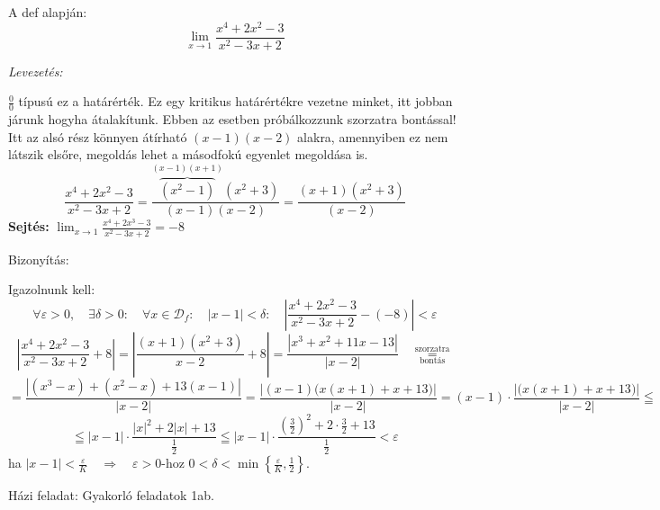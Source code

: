 \documentclass[a4paper,11.5pt]{article}
\begin{document}
		\begin{task}
			A def alapján:
			\[ \lim_{x\to1}\frac{x^4+2x^2-3}{x^2-3x+2} \]
			
			\textit{Levezetés:}
			
			$\frac{0}{0}$ típusú ez a határérték. Ez egy kritikus határértékre vezetne minket, itt jobban járunk hogyha átalakítunk. Ebben az esetben próbálkozzunk szorzatra bontással!
			Itt az alsó rész könnyen átírható $(x-1)(x-2)$ alakra, amennyiben ez nem látszik elsőre, megoldás lehet a másodfokú egyenlet megoldása is.
			\[ \frac{x^4+2x^2-3}{x^2-3x+2} = \frac{\overbrace{(x^2-1)}^{(x-1)(x+1)}(x^2+3)}{(x-1)(x-2)} = \frac{(x+1)(x^2+3)}{(x-2)}\]
			\textbf{Sejtés:} $\displaystyle \lim_{x\to1}\frac{x^4+2x^3-3}{x^2-3x+2} = -8$
			
			Bizonyítás:
			
			Igazolnunk kell:
			\[ \forall\varepsilon>0,\quad \exists\delta>0:\quad \forall x\in\mathcal{D}_f:\quad |x-1|<\delta:\quad  \left|\frac{x^4+2x^2-3}{x^2-3x+2}-(-8)\right|<\varepsilon\]
			\[ \left|\frac{x^4+2x^2-3}{x^2-3x+2} + 8\right| = \left|\frac{(x+1)(x^2+3)}{x-2} + 8\right| = \frac{\left|x^3+x^2+11x-13\right|}{|x-2|} \quad \overset{\text{szorzatra}}{\underset{\text{bontás}}{=}}\]
			\[ = \frac{\left|(x^3-x)+(x^2-x)+13(x-1)\right|}{|x-2|} = \frac{\big|(x-1)\big(x(x+1)+x+13\big)\big|}{|x-2|} = (x-1)\cdot\frac{\big|\big(x(x+1)+x+13\big)\big|}{|x-2|}\leqq \]
			\[ \leqq |x-1|\cdot\frac{|x|^2+2|x|+13}{\frac{1}{2}}\leqq|x-1|\cdot \frac{\left(\frac{3}{2}\right)^2+2\cdot\frac{3}{2}+13}{\frac{1}{2}}<\varepsilon \]
			ha $|x-1|<\frac{\varepsilon}{K}\quad \Rightarrow\quad \varepsilon>0$-hoz \quad $ 0<\delta<\min\left\{ \frac{\varepsilon}{K},\frac{1}{2}\right\}$.
			
		\end{task}
		Házi feladat: Gyakorló feladatok 1ab.
		
\end{document}
